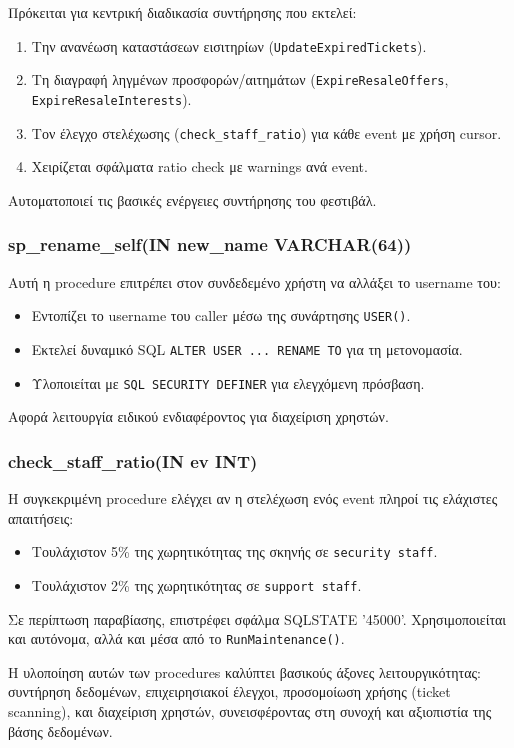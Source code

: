 \documentclass[13pt]{extarticle}
\begin{document}
Πρόκειται για κεντρική διαδικασία συντήρησης που εκτελεί:
\begin{enumerate}
    \item Την ανανέωση καταστάσεων εισιτηρίων (\texttt{UpdateExpiredTickets}).
    \item Τη διαγραφή ληγμένων προσφορών/αιτημάτων (\texttt{ExpireResaleOffers}, \texttt{ExpireResaleInterests}).
    \item Τον έλεγχο στελέχωσης (\texttt{check\_staff\_ratio}) για κάθε event με χρήση cursor.
    \item Χειρίζεται σφάλματα ratio check με warnings ανά event.
\end{enumerate}
Αυτοματοποιεί τις βασικές ενέργειες συντήρησης του φεστιβάλ.

\subsubsection{sp\_rename\_self(IN new\_name VARCHAR(64))}

Αυτή η procedure επιτρέπει στον συνδεδεμένο χρήστη να αλλάξει το username του:
\begin{itemize}
    \item Εντοπίζει το username του caller μέσω της συνάρτησης \texttt{USER()}.
    \item Εκτελεί δυναμικό SQL \texttt{ALTER USER ... RENAME TO} για τη μετονομασία.
    \item Υλοποιείται με \texttt{SQL SECURITY DEFINER} για ελεγχόμενη πρόσβαση.
\end{itemize}
Αφορά λειτουργία ειδικού ενδιαφέροντος για διαχείριση χρηστών.

\subsubsection{check\_staff\_ratio(IN ev INT)}

Η συγκεκριμένη procedure ελέγχει αν η στελέχωση ενός event πληροί τις ελάχιστες απαιτήσεις:
\begin{itemize}
    \item Τουλάχιστον 5\% της χωρητικότητας της σκηνής σε \texttt{security staff}.
    \item Τουλάχιστον 2\% της χωρητικότητας σε \texttt{support staff}.
\end{itemize}
Σε περίπτωση παραβίασης, επιστρέφει σφάλμα SQLSTATE '45000'.  
Χρησιμοποιείται και αυτόνομα, αλλά και μέσα από το \texttt{RunMaintenance()}.

\vspace{0.5cm}
Η υλοποίηση αυτών των procedures καλύπτει βασικούς άξονες λειτουργικότητας: συντήρηση δεδομένων, επιχειρησιακοί έλεγχοι, προσομοίωση χρήσης (ticket scanning), και διαχείριση χρηστών, συνεισφέροντας στη συνοχή και αξιοπιστία της βάσης δεδομένων.
\end{document}
